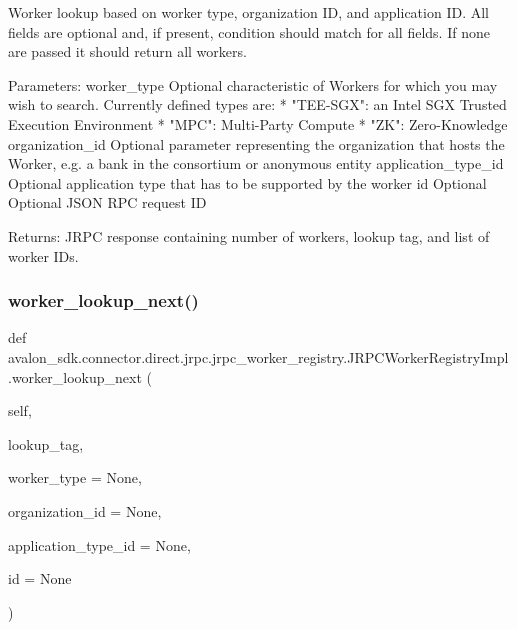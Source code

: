 \begin{DoxyVerb}Worker lookup based on worker type, organization ID,
and application ID.
All fields are optional and, if present, condition should match for
all fields. If none are passed it should return all workers.

Parameters:
worker_type         Optional characteristic of Workers for which you
            may wish to search. Currently defined types are:
            * "TEE-SGX": an Intel SGX Trusted Execution
              Environment
            * "MPC": Multi-Party Compute
            * "ZK": Zero-Knowledge
organization_id     Optional parameter representing the
            organization that hosts the Worker,
            e.g. a bank in the consortium or
            anonymous entity
application_type_id Optional application type that has to be supported
            by the worker
id                  Optional Optional JSON RPC request ID


Returns:
JRPC response containing number of workers,
lookup tag, and list of worker IDs.
\end{DoxyVerb}
 \mbox{\label{classavalon__sdk_1_1connector_1_1direct_1_1jrpc_1_1jrpc__worker__registry_1_1JRPCWorkerRegistryImpl_ac23634a6538293c637296acfa9561f07}} 
\subsubsection{\texorpdfstring{worker\+\_\+lookup\+\_\+next()}{worker\_lookup\_next()}}
{\footnotesize\ttfamily def avalon\+\_\+sdk.\+connector.\+direct.\+jrpc.\+jrpc\+\_\+worker\+\_\+registry.\+J\+R\+P\+C\+Worker\+Registry\+Impl.\+worker\+\_\+lookup\+\_\+next (\begin{DoxyParamCaption}\item[{}]{self,  }\item[{}]{lookup\+\_\+tag,  }\item[{}]{worker\+\_\+type = {\ttfamily None},  }\item[{}]{organization\+\_\+id = {\ttfamily None},  }\item[{}]{application\+\_\+type\+\_\+id = {\ttfamily None},  }\item[{}]{id = {\ttfamily None} }\end{DoxyParamCaption})}

